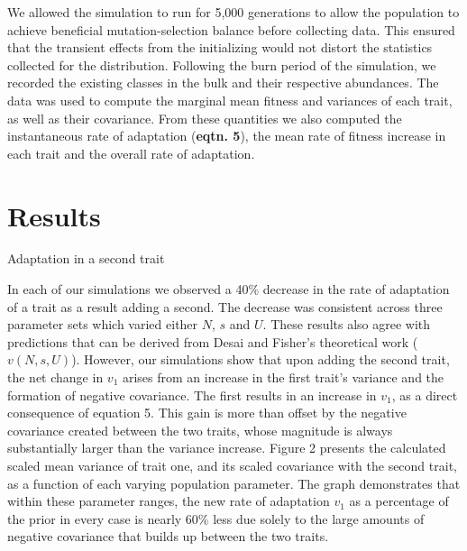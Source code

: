 \documentclass[11pt,twocolumn]{article}
\begin{document}
We allowed the simulation to run for 5,000 generations to allow the population to achieve beneficial mutation-selection balance before collecting data. This ensured that the transient effects from the initializing would not distort the statistics collected for the distribution. Following the burn period of the simulation, we recorded the existing classes in the bulk and their respective abundances. The data was used to compute the marginal mean fitness and variances of each trait, as well as their covariance. From these quantities we also computed the instantaneous rate of adaptation (\textbf{eqtn. 5}), the mean rate of fitness increase in each trait and the overall rate of adaptation.

\section{Results}
Adaptation in a second trait 

In each of our simulations we observed a 40\% decrease in the rate of adaptation of a trait as a result adding a second. The decrease was consistent across three parameter sets which varied either $N$, $s$ and $U$. These results also agree with predictions that can be derived from Desai and Fisher's theoretical work ($v(N,s,U)$). However, our simulations show that upon adding the second trait, the net change in $v_1$ arises from an increase in the first trait's variance and the formation of negative covariance. The first results in an increase in $v_1$, as a direct consequence of equation 5. This gain is more than offset by the negative covariance created between the two traits, whose magnitude is always substantially larger than the variance increase.  Figure 2 presents the calculated scaled mean variance of trait one, and its scaled covariance with the second trait, as a function of each varying population parameter. The graph demonstrates that within these parameter ranges, the new rate of adaptation $v_1$ as a percentage of the prior in every case is nearly 60\% less due solely to the large amounts of negative covariance that builds up between the two traits.\par
\end{document}
